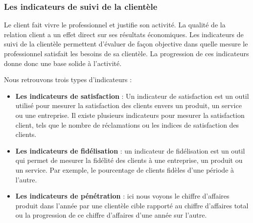             \subsubsection[Les indicateurs de suivi de la clientèles]{Les indicateurs de suivi de la clientèle}
            Le client fait vivre le professionnel et justifie son activité.
            La qualité de la relation client a un effet direct sur ses résultats économiques.
            Les indicateurs de suivi de la clientèle permettent d’évaluer de façon
            objective dans quelle mesure le professionnel satisfait les besoins
            de sa clientèle. La progression de ces indicateurs donne donc une base solide à l’activité.
            \par
            Nous retrouvons trois types d’indicateurs :
            \par
                \begin{itemize}
                    \setlength{\itemsep}{0pt}
                    \item [\ding{226}] \textbf{Les indicateurs de satisfaction} :
                    Un indicateur de satisfaction est un outil utilisé pour mesurer
                    la satisfaction des clients envers un produit, un service ou une
                    entreprise. Il existe plusieurs indicateurs pour mesurer la
                    satisfaction client, tels que le nombre de réclamations ou
                    les indices de satisfaction des clients.
                    \item [\ding{226}] \textbf{Les indicateurs de fidélisation} :
                    un indicateur de fidélisation est un outil qui permet de mesurer
                    la fidélité des clients à une entreprise, un produit ou un service.
                    Par exemple, le pourcentage de clients fidèles d’une période à l’autre.
                    \item [\ding{226}] \textbf{Les indicateurs de pénétration} :
                    ici nous voyons le chiffre d’affaires produit dans l’année
                    par une clientèle cible rapporté au chiffre d’affaires total
                    ou la progression de ce chiffre d’affaires d’une année sur l’autre.
                \end{itemize}
